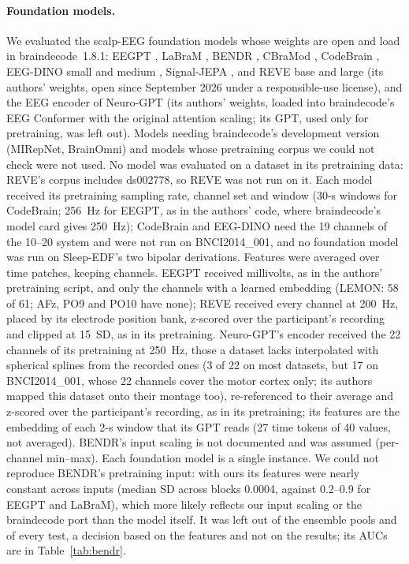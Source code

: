 \documentclass[11pt]{article}
\begin{document}
\paragraph{Foundation models.} We evaluated the scalp-EEG foundation models whose weights are
open and load in braindecode~1.8.1: EEGPT \citep{wang2024eegpt}, LaBraM \citep{jiang2024labram},
BENDR \citep{kostas2021bendr}, CBraMod \citep{wang2025cbramod}, CodeBrain \citep{ma2026codebrain},
EEG-DINO small and medium \citep{wang2025eegdino}, Signal-JEPA \citep{guetschel2024sjepa}, and
REVE base and large \citep{elouahidi2025reve} (its authors' weights, open since September 2026 under
a responsible-use license), and the EEG encoder of Neuro-GPT \citep{cui2024neurogpt} (its authors'
weights, loaded into braindecode's EEG Conformer with the original attention scaling; its GPT,
used only for pretraining, was left out). Models needing braindecode's development version (MIRepNet, BrainOmni)
and models whose pretraining corpus we could not check were not used. No model was evaluated on a
dataset in its pretraining data: REVE's corpus includes ds002778, so REVE was not run on it. Each model received its pretraining sampling rate, channel set and window
(30-s windows for CodeBrain; 256~Hz for EEGPT, as in the authors' code, where braindecode's model
card gives 250~Hz); CodeBrain and EEG-DINO need the 19 channels of the 10--20 system and
were not run on BNCI2014\_001, and no foundation model was run on Sleep-EDF's two bipolar
derivations. Features were averaged over time patches, keeping channels. EEGPT received millivolts,
as in the authors' pretraining script, and only the channels with a learned embedding (LEMON: 58
of 61; AFz, PO9 and PO10 have none); REVE received every channel at 200~Hz, placed by its
electrode position bank, z-scored over the participant's recording and clipped at 15~SD, as in its
pretraining. Neuro-GPT's encoder received the 22 channels of its pretraining at 250~Hz, those a
dataset lacks interpolated with spherical splines from the recorded ones (3 of 22 on most datasets,
but 17 on BNCI2014\_001, whose 22 channels cover the motor cortex only; its authors mapped this
dataset onto their montage too), re-referenced to their average and z-scored over the participant's
recording, as in its pretraining; its features are the embedding of each 2-s window that its GPT
reads (27 time tokens of 40 values, not averaged). BENDR's input scaling is not documented and was assumed
(per-channel min--max). Each foundation model is a single instance. We could not reproduce BENDR's
pretraining input: with ours its features were nearly constant across inputs (median SD across
blocks 0.0004, against 0.2--0.9 for EEGPT and LaBraM), which more likely reflects our input
scaling or the braindecode port than the model itself. It was left out of the ensemble pools and
of every test, a decision based on the features and not on the results; its AUCs are in
Table~\ref{tab:bendr}.
\end{document}
